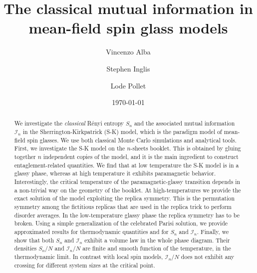 \documentclass[twocolumn,superscriptaddress,prb,10pt]{revtex4-1}
\begin{document}
\title{The classical mutual information in mean-field spin glass models} 

\author{Vincenzo Alba}
\author{Stephen Inglis}
\author{Lode Pollet}

\date{\today}




\begin{abstract} 

We investigate the \emph{classical} R\'enyi entropy $S_n$ and the associated mutual 
information ${\mathcal I}_n$ in the Sherrington-Kirkpatrick (S-K) model, which is the 
paradigm model of mean-field spin glasses. We use both classical Monte Carlo simulations 
and analytical tools. First, we investigate the S-K model on the $n$-sheets booklet. This 
is obtained by gluing together $n$ independent copies of the model, and it is the 
main ingredient to construct entaglement-related quantities. We find that at low temperature 
the S-K model is in a glassy phase, whereas at high temperature it exhibits paramagnetic 
behavior. Interestingly, the critical temperature of the paramagnetic-glassy transition 
depends in a non-trivial way on the geometry of the booklet. At high-temperatures we provide 
the exact solution of the model exploiting the replica symmetry. This is the permutation 
symmetry among the fictitious replicas that are used in the replica trick to perform disorder 
averages. In the low-temperature glassy phase the replica symmetry has 
to be broken. Using a simple generalization of the celebrated Parisi solution, we provide 
approximated results for thermodynamic quantities and for $S_n$ and ${\mathcal I}_n$. 
Finally, we show that both $S_n$ and ${\mathcal I}_n$ exhibit a volume law in the whole phase 
diagram. Their densities $S_n/N$ and ${\mathcal I}_n/N$ are finite and smooth 
function of the temperature, in the thermodynamic limit. In contrast with local spin models, 
${\mathcal I}_n/N$ does not exhibit any crossing for different system sizes at the 
critical point. 

\end{abstract}
\end{document}

